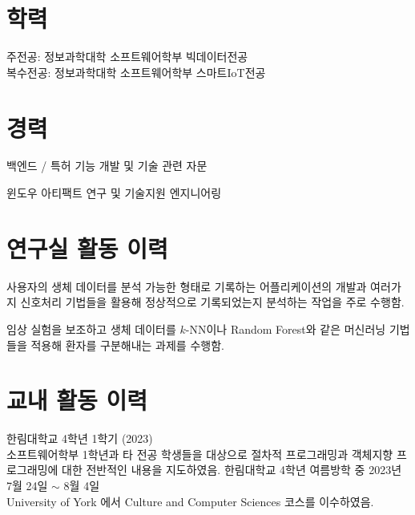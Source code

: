 \documentclass[11pt,a4paper]{moderncv}
\title{}
\begin{document}
\maketitle

\section{학력}
{
주전공: 정보과학대학 소프트웨어학부 빅데이터전공\\
복수전공: 정보과학대학 소프트웨어학부 스마트IoT전공
}

\section{경력}
{백엔드 / 특허 기능 개발 및 기술 관련 자문}

{윈도우 아티팩트 연구 및 기술지원 엔지니어링}

\section{연구실 활동 이력}
{사용자의 생체 데이터를 분석 가능한 형태로 기록하는 어플리케이션의 개발과 여러가지 신호처리 기법들을 활용해 정상적으로 기록되었는지 분석하는 작업을 주로 수행함.}

{임상 실험을 보조하고 생체 데이터를 $k$-NN이나 Random Forest와 같은 머신러닝 기법들을 적용해 환자를 구분해내는 과제를 수행함.}

\section{교내 활동 이력}
{{\footnotesize 한림대학교 4학년 1학기 (2023)}\\
    소프트웨어학부 1학년과 타 전공 학생들을 대상으로 절차적 프로그래밍과 객체지향 프로그래밍에 대한 전반적인 내용을 지도하였음.}
{{\footnotesize 한림대학교 4학년 여름방학 중 2023년 7월  24일 $\sim$ 8월  4일}\\
    University of York 에서 Culture and Computer Sciences 코스를 이수하였음.}
\end{document}
